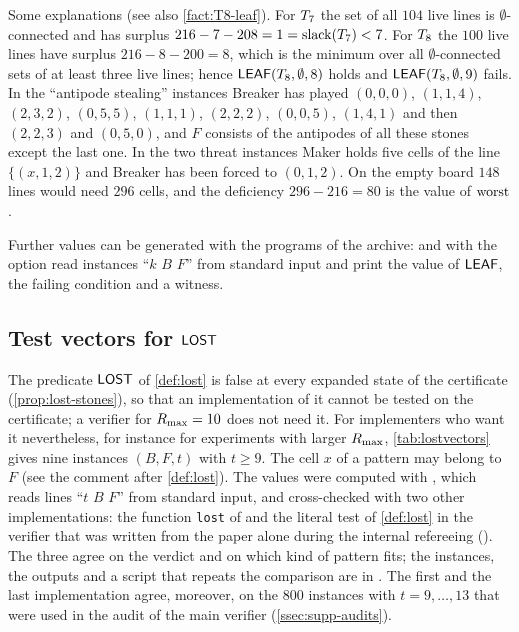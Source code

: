 Some explanations (see also \cref{fact:T8-leaf}). For $T_7$ the set of all $104$ live lines is
$\emptyset$-connected and has surplus $216-7-208=1=\operatorname{slack}(T_7)<7$. For $T_8$ the $100$ live lines
have surplus $216-8-200=8$, which is the minimum over all $\emptyset$-connected sets of at least three
live lines; hence $\mathsf{LEAF}(T_8,\emptyset,8)$ holds and $\mathsf{LEAF}(T_8,\emptyset,9)$ fails. In the ``antipode stealing''
instances Breaker has played $(0,0,0)$, $(1,1,4)$, $(2,3,2)$, $(0,5,5)$, $(1,1,1)$, $(2,2,2)$, $(0,0,5)$,
$(1,4,1)$ and then $(2,2,3)$ and $(0,5,0)$, and $F$ consists of the antipodes of all these stones except the
last one. In the two threat instances Maker holds five cells of the line $\{(x,1,2)\}$ and Breaker has been
forced to $(0,1,2)$. On the empty board $148$ lines would need $296$ cells, and the deficiency
$296-216=80$ is the value of $\operatorname{worst}$.

Further values can be generated with the programs of the archive:  and
 with the option  read instances ``$k$ $B$ $F$'' from standard input and
print the value of $\mathsf{LEAF}$, the failing condition and a witness.

\subsection{Test vectors for \texorpdfstring{$\mathsf{LOST}$}{LOST}}\label{ssec:fmt-lost}

The predicate $\mathsf{LOST}$ of \cref{def:lost} is false at every expanded state of the certificate
(\cref{prop:lost-stones}), so that an implementation of it cannot be tested on the certificate; a verifier
for $R_{\max}=10$ does not need it. For implementers who want it nevertheless, for instance for experiments
with larger $R_{\max}$, \cref{tab:lostvectors} gives nine instances $(B,F,t)$ with $t\ge 9$. The cell $x$
of a pattern may belong to $F$ (see the comment after \cref{def:lost}). The values were computed with
 , which reads lines ``$t$ $B$ $F$'' from standard input, and
cross-checked with two other implementations: the function \texttt{lost} of  and
the literal test of \cref{def:lost} in the verifier that was written from the paper alone during the
internal refereeing
(). The three agree on the verdict and on which kind of
pattern fits; the instances, the outputs and a script that repeats the comparison are in
. The first and the last implementation agree, moreover, on the $800$
instances with $t=9,\dots,13$ that were used in the audit of the main verifier (\cref{ssec:supp-audits}).

